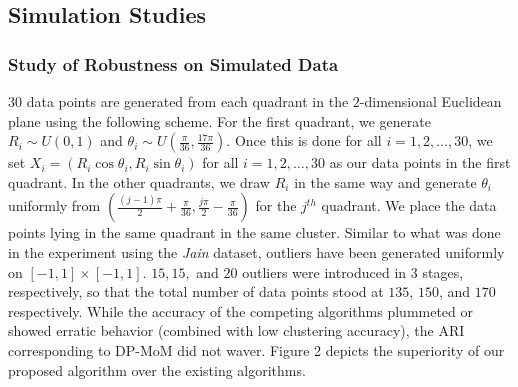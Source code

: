 \documentclass{article}
\begin{document}
\subsection{Simulation Studies}

\subsubsection{Study of Robustness on Simulated Data} $30$ data points are generated from each quadrant in the $2$-dimensional Euclidean plane using the following scheme. For the first quadrant, we generate $R_i \sim U(0, 1)$ and $\theta_i \sim U\left(\frac{\pi}{36}, \frac{17\pi}{36}\right)$. Once this is done for all $i=1,2,\ldots,30$, we set $X_i = (R_i\cos\theta_i, R_i\sin \theta_i)$ for all $i=1,2,\ldots,30$ as our data points in the first quadrant. In the other quadrants, we draw $R_i$ in the same way and generate $\theta_i$ uniformly from $\left(\frac{(j - 1)\pi}{2} + \frac{\pi}{36}, \frac{j\pi}{2} - \frac{\pi}{36}\right)$ for the $j^{th}$ quadrant. We place the data points lying in the same quadrant in the same cluster. Similar to what was done in the experiment using the \textit{Jain} dataset, outliers have been generated uniformly on $[-1, 1] \times [-1, 1]$. $15, 15,$ and $20$ outliers were introduced in 3 stages, respectively, so that the total number of data points stood at $135$, $150$, and $170$ respectively. While the accuracy of the competing algorithms plummeted or showed erratic behavior (combined with low clustering accuracy), the ARI corresponding to DP-MoM did not waver. Figure 2 depicts the superiority of our proposed algorithm over the existing algorithms.

\end{document}
